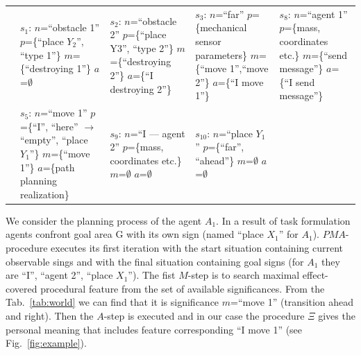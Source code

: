 \documentclass[runningheads,a4paper]{llncs}
\begin{document}
\begin{table}
\begin{tabular}{| p{1.5cm} | p{2.2cm} | p{2.2cm} | p{2.2cm} | p{2.2cm} |}
		&
		$s_1$: $n$=``obstacle 1''\newline
		$p$=\{``place $Y_2$'', ``type 1''\}\newline
		$m$=\{``destroying 1''\}\newline
		$a$=$\emptyset$
		&
		$s_2$: $n$=``obstacle 2''\newline
		$p$=\{``place Y3'', ``type 2''\}\newline
		$m$=\{``destroying 2''\}\newline
		$a$=\{``I destroying 2''\}
		&
		$s_3$: $n$=``far''\newline
		$p$=\{mechanical sensor parameters\}\newline
		$m$=\{``move 1'',``move 2''\}\newline
		$a$=\{``I move 1''\}	
		&
		$s_8$: $n$=``agent 1''\newline
		$p$=\{mass, coordinates etc.\}\newline
		$m$=\{``send message''\}\newline
		$a$=\{``I send message''\}
		\\\cline{2-5}
		&
		$s_5$: $n$=``move 1''\newline
		$p$=\{``I'', ``here'' $\rightarrow$ ``empty'', ``place $Y_1$''\}\newline
		$m$=\{``move 1''\}\newline
		$a$=\{path planning realization\}	
		&
		$s_9$: $n$=``I --- agent 2''\newline
		$p$=\{mass, coordinates etc.\}\newline
		$m$=$\emptyset$\newline
		$a$=$\emptyset$
		&
		$s_{10}$: $n$=``place $Y_1$''\newline
		$p$=\{``far'', ``ahead''\}\newline
		$m$=$\emptyset$\newline
		$a$=$\emptyset$	
		&
		\\\hline
	\end{tabular}
\end{table}

We consider the planning process of the agent $A_1$. In a result of task formulation agents confront goal area G with its own sign (named ``place $X_1$'' for $A_1$). $PMA$-procedure executes its first iteration with the start situation containing current observable sings and with the final situation containing goal signs (for $A_1$ they are ``I'', ``agent 2'', ``place $X_1$''). The fist $M$-step is to search maximal effect-covered procedural feature from the set of available significances. From the Tab.~\ref{tab:world} we can find that it is significance $m$=``move 1'' (transition ahead and right). Then the $A$-step is executed and in our case the procedure $\Xi$ gives the personal meaning that includes feature corresponding ``I move 1'' (see Fig.~\ref{fig:example}).
\end{document}
